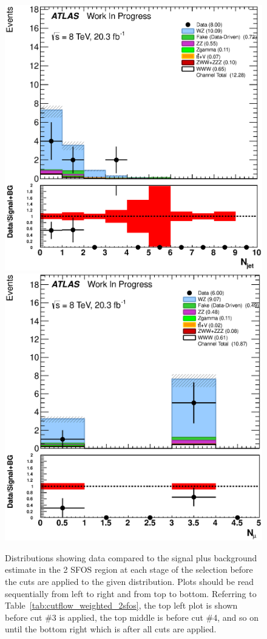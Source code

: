 \begin{figure}[ht!]
\includegraphics[width=0.3\columnwidth]{figures/appendix_signal_selection/Nov24Update_FakeSys_KFacSys_LinearY_Rebin/output/jobs/MxM/DataFull_Rates_May13_FakeRatesExactly2Loose_MuonMxMBJetGt0_ElBJetGt0SubtractPC_MxM/PreselectionNov23_15_2SFOS_ChargeAbs1_BVeto85_ZVeto20GeV_METGt55GeV_DeltaPhi2p5_physics/weight_all/eps/NJets_histratio.eps}
\includegraphics[width=0.3\columnwidth]{figures/appendix_signal_selection/Nov24Update_FakeSys_KFacSys_LinearY_Rebin/output/jobs/MxM/DataFull_Rates_May13_FakeRatesExactly2Loose_MuonMxMBJetGt0_ElBJetGt0SubtractPC_MxM/PreselectionNov23_15_2SFOS_ChargeAbs1_BVeto85_ZVeto20GeV_METGt55GeV_DeltaPhi2p5_NJetLt2_physics/weight_all/eps/NMuons_histratio.eps}



\caption{Distributions showing data compared to the signal plus background estimate in the 2 SFOS region at each stage 
of the selection before the cuts are applied to the given distribution. Plots should be read sequentially from left to right
and from top to bottom. 
Referring to Table~\ref{tab:cutflow_weighted_2sfos}, the top left
plot is shown before cut \#3 is applied, the top middle is before cut \#4, and
so on until the bottom right which is after all cuts are applied.}
\label{fig:2sfos}
\end{figure}



